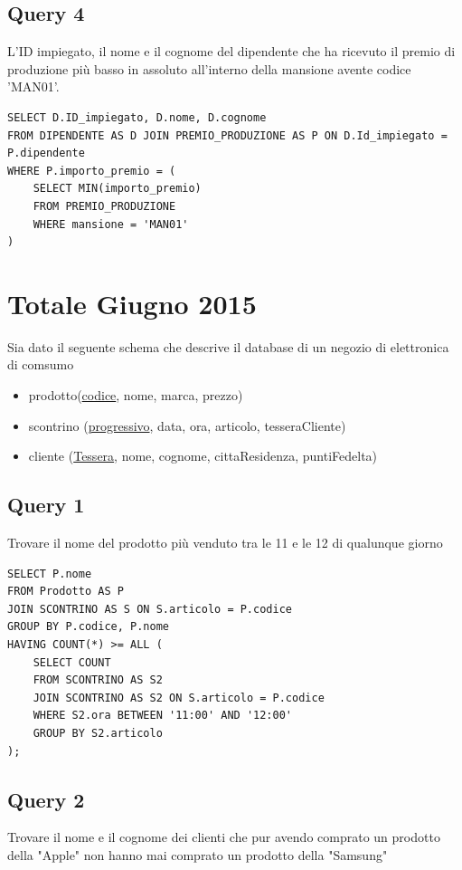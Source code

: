 \subsection{Query 4}
L'ID impiegato, il nome e il cognome del dipendente che ha ricevuto il premio di produzione più basso in assoluto all'interno della mansione avente codice 'MAN01'.

\begin{lstlisting}
SELECT D.ID_impiegato, D.nome, D.cognome
FROM DIPENDENTE AS D JOIN PREMIO_PRODUZIONE AS P ON D.Id_impiegato = P.dipendente
WHERE P.importo_premio = (
    SELECT MIN(importo_premio) 
    FROM PREMIO_PRODUZIONE 
    WHERE mansione = 'MAN01'
)
\end{lstlisting}

\newpage
\section{Totale Giugno 2015}
Sia dato il seguente schema che descrive il database di un negozio di elettronica di comsumo

\begin{itemize}
    \item prodotto(\underline{codice}, nome, marca, prezzo)
    \item scontrino (\underline{progressivo}, data, ora, articolo, tesseraCliente)
    \item cliente (\underline{Tessera}, nome, cognome, cittaResidenza, puntiFedelta)
\end{itemize}
\subsection{Query 1}
Trovare il nome del prodotto più venduto tra le 11 e le 12 di qualunque giorno
\begin{lstlisting}
SELECT P.nome 
FROM Prodotto AS P
JOIN SCONTRINO AS S ON S.articolo = P.codice
GROUP BY P.codice, P.nome
HAVING COUNT(*) >= ALL (
    SELECT COUNT
    FROM SCONTRINO AS S2
    JOIN SCONTRINO AS S2 ON S.articolo = P.codice
    WHERE S2.ora BETWEEN '11:00' AND '12:00'
    GROUP BY S2.articolo
);
\end{lstlisting}


\subsection{Query 2}
Trovare il nome e il cognome dei clienti che pur avendo comprato un prodotto della "Apple" non hanno mai comprato un prodotto della "Samsung"

